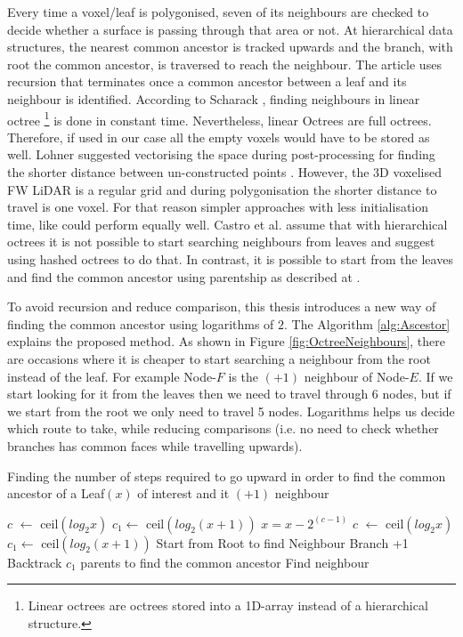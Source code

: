 \documentclass{subfiles}
\begin{document}
\par Every time a voxel/leaf is polygonised, seven of its neighbours are checked to decide whether a surface is passing through that area or not. At hierarchical data structures, the nearest common ancestor is tracked upwards and the branch, with root the common ancestor, is traversed to reach the neighbour. The article \cite{Hanan1989} uses recursion that terminates once a common ancestor between a leaf and its neighbour is identified. According to Scharack \cite{Schrack1992}, finding neighbours in linear octree \footnote{Linear octrees are octrees stored into a 1D-array instead of a hierarchical structure.} is done in constant time. Nevertheless, linear Octrees are full octrees. Therefore, if used in our case all the empty voxels would have to be stored as well. Lohner suggested vectorising the space during post-processing for finding the shorter distance between un-constructed points \cite{Lohner1994}. However, the 3D voxelised FW LiDAR is a regular grid and during polygonisation the shorter distance to travel is one voxel. For that reason simpler approaches with less initialisation time, like \cite{Schrack1992} could perform equally well. Castro et al. \cite{Castro2008} assume that with hierarchical octrees it is not possible to start searching neighbours from leaves and suggest using hashed octrees to do that. In contrast, it is possible to start from the leaves and find the common ancestor using parentship as described at \cite{Hanan1989}.

\par To avoid recursion and reduce comparison, this thesis introduces a new way of finding the  common ancestor using logarithms of $2$. The Algorithm \ref{alg:Ascestor} explains the proposed method. As shown in Figure \ref{fig:OctreeNeighbours}, there are occasions where it is cheaper to start searching a neighbour from the root instead of the leaf. For example Node-$F$ is the $(+1)$ neighbour of Node-$E$. If we start looking for it from the leaves then we need to travel through 6 nodes, but if we start from the root we only need to travel 5 nodes. Logarithms helps us decide which route to take, while reducing comparisons (i.e. no need to check whether branches has common faces while travelling upwards\cite{Hanan1989}).

\begin{algorithm}[!htbp]
	\caption{Finding the number of steps required to go upward in order to find the common ancestor of a Leaf$(x)$ of interest and it $(+1)$ neighbour}
	\label{alg:Ascestor}
	\centering
	\begin{algorithmic}[1]
		\State $c $  $\gets$ ceil$(log_2 x)$
		\State $c_1 \gets$ ceil$(log_2 (x+1))$
		\State $x = x - 2^{(c-1)} $
		\State $c $  $\gets$ ceil$(log_2 x)$
		\State $c_1 \gets$ ceil$(log_2 (x+1))$		
		\EndWhile
		\State Start from Root to find Neighbour Branch +1
		\Else
		\State Backtrack $c_1$ parents to find the common ancestor
		\State Find neighbour
		\EndIf
	\end{algorithmic}
\end{algorithm}
\end{document}
